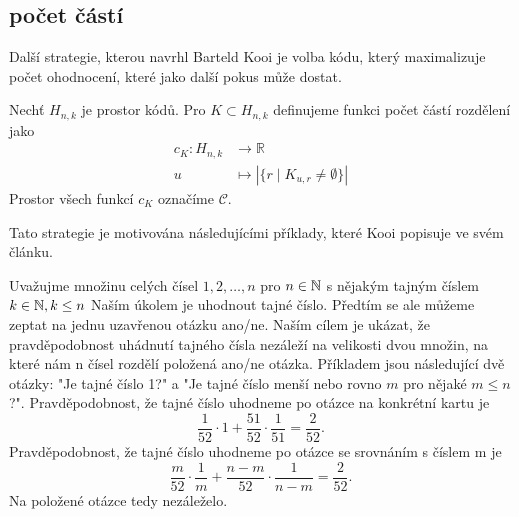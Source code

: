 



\subsection{počet částí}
Další strategie, kterou navrhl Barteld Kooi \cite{kooi} je volba kódu, který maximalizuje počet ohodnocení, které jako další pokus může dostat. 
\begin{definice}
    Nechť $H_{n,k}$ je prostor kódů. Pro $K \subset H_{n,k}$ definujeme funkci počet částí rozdělení jako
    \begin{align*}
        c_K \colon H_{n,k} &\to \mathbb{R} \\
        u &\mapsto |\{r \mid K_{u,r} \neq \emptyset\}|
    \end{align*}
    Prostor všech funkcí $c_K$ označíme $\mathcal{C}$. 
\end{definice}
Tato strategie je motivována následujícími příklady, které Kooi popisuje ve svém článku. 

\begin{prikl}\label{prdvecasti}
    Uvažujme množinu celých čísel $1,2,\dots, n$ pro $n \in \mathbb{N} $ s nějakým tajným číslem $k \in \mathbb{N}, k\leq n$ Naším úkolem je uhodnout tajné číslo. Předtím se ale můžeme zeptat na jednu uzavřenou otázku ano/ne. Naším cílem je ukázat, že pravděpodobnost uhádnutí tajného čísla nezáleží na velikosti dvou množin, na které nám n čísel rozdělí položená ano/ne otázka. Příkladem jsou následující dvě otázky: "Je tajné číslo 1?" a "Je tajné číslo menší nebo rovno $m$ pro nějaké $m \leq n$?".
    Pravděpodobnost, že tajné číslo uhodneme po otázce na konkrétní kartu je 
    \[\frac{1}{52} \cdot 1 + \frac{51}{52} \cdot \frac{1}{51} = \frac{2}{52}.\] 
    Pravděpodobnost, že tajné číslo uhodneme po otázce se srovnáním s číslem m je 
    \[\frac{m}{52} \cdot \frac{1}{m} + \frac{n-m}{52} \cdot \frac{1}{n-m} = \frac{2}{52}.\] 
    Na položené otázce tedy nezáleželo.
\end{prikl}


